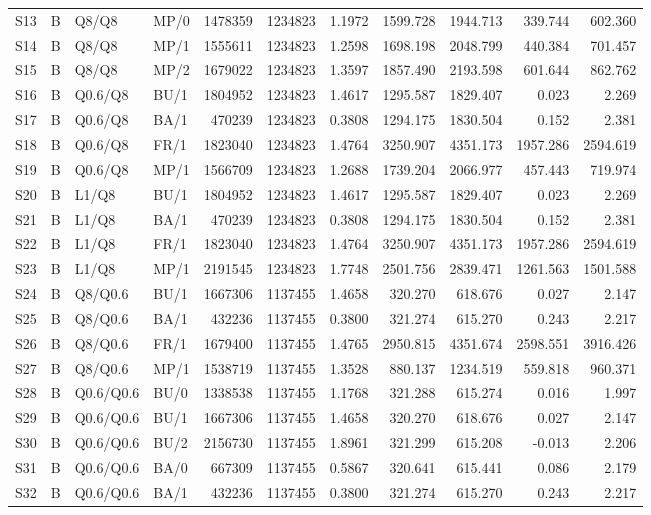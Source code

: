 \begin{longtable}{llllrrrrrrr}
S13 & B & Q8/Q8 & MP/0 & 1478359 & 1234823 & 1.1972 & 1599.728 & 1944.713 & 339.744 & 602.360\\
S14 & B & Q8/Q8 & MP/1 & 1555611 & 1234823 & 1.2598 & 1698.198 & 2048.799 & 440.384 & 701.457\\
S15 & B & Q8/Q8 & MP/2 & 1679022 & 1234823 & 1.3597 & 1857.490 & 2193.598 & 601.644 & 862.762\\
S16 & B & Q0.6/Q8 & BU/1 & 1804952 & 1234823 & 1.4617 & 1295.587 & 1829.407 & 0.023 & 2.269\\
S17 & B & Q0.6/Q8 & BA/1 & 470239 & 1234823 & 0.3808 & 1294.175 & 1830.504 & 0.152 & 2.381\\
S18 & B & Q0.6/Q8 & FR/1 & 1823040 & 1234823 & 1.4764 & 3250.907 & 4351.173 & 1957.286 & 2594.619\\
S19 & B & Q0.6/Q8 & MP/1 & 1566709 & 1234823 & 1.2688 & 1739.204 & 2066.977 & 457.443 & 719.974\\
S20 & B & L1/Q8 & BU/1 & 1804952 & 1234823 & 1.4617 & 1295.587 & 1829.407 & 0.023 & 2.269\\
S21 & B & L1/Q8 & BA/1 & 470239 & 1234823 & 0.3808 & 1294.175 & 1830.504 & 0.152 & 2.381\\
S22 & B & L1/Q8 & FR/1 & 1823040 & 1234823 & 1.4764 & 3250.907 & 4351.173 & 1957.286 & 2594.619\\
S23 & B & L1/Q8 & MP/1 & 2191545 & 1234823 & 1.7748 & 2501.756 & 2839.471 & 1261.563 & 1501.588\\
S24 & B & Q8/Q0.6 & BU/1 & 1667306 & 1137455 & 1.4658 & 320.270 & 618.676 & 0.027 & 2.147\\
S25 & B & Q8/Q0.6 & BA/1 & 432236 & 1137455 & 0.3800 & 321.274 & 615.270 & 0.243 & 2.217\\
S26 & B & Q8/Q0.6 & FR/1 & 1679400 & 1137455 & 1.4765 & 2950.815 & 4351.674 & 2598.551 & 3916.426\\
S27 & B & Q8/Q0.6 & MP/1 & 1538719 & 1137455 & 1.3528 & 880.137 & 1234.519 & 559.818 & 960.371\\
S28 & B & Q0.6/Q0.6 & BU/0 & 1338538 & 1137455 & 1.1768 & 321.288 & 615.274 & 0.016 & 1.997\\
S29 & B & Q0.6/Q0.6 & BU/1 & 1667306 & 1137455 & 1.4658 & 320.270 & 618.676 & 0.027 & 2.147\\
S30 & B & Q0.6/Q0.6 & BU/2 & 2156730 & 1137455 & 1.8961 & 321.299 & 615.208 & -0.013 & 2.206\\
S31 & B & Q0.6/Q0.6 & BA/0 & 667309 & 1137455 & 0.5867 & 320.641 & 615.441 & 0.086 & 2.179\\
S32 & B & Q0.6/Q0.6 & BA/1 & 432236 & 1137455 & 0.3800 & 321.274 & 615.270 & 0.243 & 2.217\\

\end{longtable}
